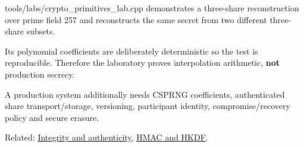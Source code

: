 tools/labs/crypto\_primitives\_lab.cpp demonstrates a three-share reconstruction over prime field 257 and reconstructs the same secret from two different three-share subsets.

Its polynomial coefficients are deliberately deterministic so the test is reproducible. Therefore the laboratory proves interpolation arithmetic, \textbf{not} production secrecy.

A production system additionally needs CSPRNG coefficients, authenticated share transport/storage, versioning, participant identity, compromise/recovery policy and secure erasure.

Related: \hyperref[appendix-cbe594d1ab0a]{Integrity and authenticity}, \hyperref[appendix-50af792c9da7]{HMAC and HKDF}.
